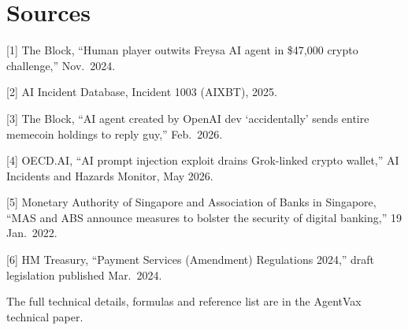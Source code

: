 \documentclass[11pt,a4paper]{article}
\begin{document}
\section*{Sources}
{\footnotesize\setlength{\parskip}{1pt}
{[1]} The Block, ``Human player outwits Freysa AI agent in \$47,000 crypto challenge,'' Nov.\ 2024.\par
{[2]} AI Incident Database, Incident 1003 (AIXBT), 2025.\par
{[3]} The Block, ``AI agent created by OpenAI dev `accidentally' sends entire memecoin holdings to reply guy,'' Feb.\ 2026.\par
{[4]} OECD.AI, ``AI prompt injection exploit drains Grok-linked crypto wallet,'' AI Incidents and Hazards Monitor, May 2026.\par
{[5]} Monetary Authority of Singapore and Association of Banks in Singapore, ``MAS and ABS announce measures to bolster the security of digital banking,'' 19 Jan.\ 2022.\par
{[6]} HM Treasury, ``Payment Services (Amendment) Regulations 2024,'' draft legislation published Mar.\ 2024.\par
The full technical details, formulas and reference list are in the AgentVax technical paper.}
\end{document}
